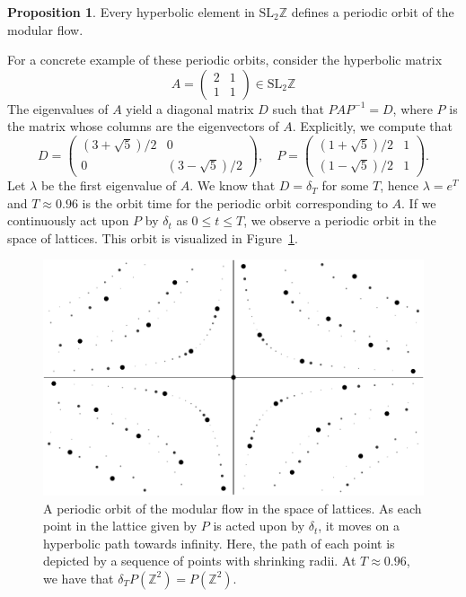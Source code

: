 \documentclass[12pt,twoside]{reedthesis}
\theoremstyle{definition}
\newtheorem{prop}[thm]{Proposition}
\newcommand{\Z}{\mathbb{Z}}
\newcommand{\SLZ}{\mathrm{SL}_2{\Z}}
\begin{document}
\begin{prop}\label{prop:hyperbolic_defines_flow}
  Every hyperbolic element in $\SLZ$ defines a periodic orbit of the modular flow.
\end{prop}

For a concrete example of these periodic orbits, consider the hyperbolic matrix
\begin{equation*}
  A = \begin{pmatrix}
    2 & 1 \\
    1 & 1
  \end{pmatrix}
  \in \SLZ
\end{equation*}
The eigenvalues of $A$ yield a diagonal matrix $D$ such that $PAP^{-1} = D$, where $P$ is the matrix whose columns are the eigenvectors of $A$.
Explicitly, we compute that
\begin{equation*}
  D = \begin{pmatrix}
    (3 + \sqrt{5}) / 2 & 0 \\
    0 & (3 - \sqrt{5}) / 2
  \end{pmatrix}, \quad P = \begin{pmatrix}
    (1 + \sqrt{5}) / 2 & 1 \\
    (1 - \sqrt{5}) / 2 & 1
  \end{pmatrix}.
\end{equation*}
Let $\lambda$ be the first eigenvalue of $A$.
We know that $D = \delta_T$ for some $T$, hence $\lambda = e^T$ and $T \approx 0.96$ is the orbit time for the periodic orbit corresponding to $A$.
If we continuously act upon $P$ by $\delta_t$ as $0 \leq t \leq T$, we observe a periodic orbit in the space of lattices.
This orbit is visualized in Figure~\ref{fig:periodic_orbits_lattice}.

\begin{figure}[h]
  \centering
  \includegraphics[width=0.8\linewidth]{figures/periodic_orbits_lattice.pdf}
  \caption{A periodic orbit of the modular flow in the space of lattices. As each point in the lattice given by $P$ is acted upon by $\delta_t$, it moves on a hyperbolic path towards infinity. Here, the path of each point is depicted by a sequence of points with shrinking radii. At $T \approx 0.96$, we have that $\delta_T P(\Z^2) = P(\Z^2)$.}
  \label{fig:periodic_orbits_lattice}
\end{figure}
\end{document}
